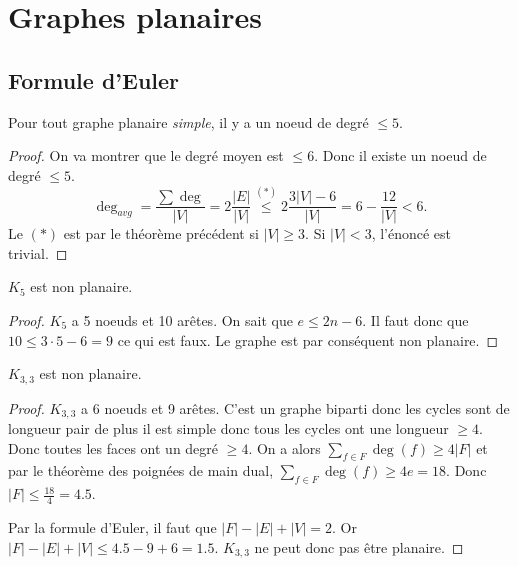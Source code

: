 \section{Graphes planaires}
\subsection{Formule d'Euler}
\begin{mytheo}
  Pour tout graphe planaire \emph{simple}, il y a un noeud de degré $\leq 5$.
  \begin{proof}
    On va montrer que le degré moyen est $\leq 6$.
    Donc il existe un noeud de degré $\leq 5$.
    \[ \deg_{avg} = \frac{\sum \deg}{|V|} = 2\frac{|E|}{|V|} \stackrel{(*)}{\leq} 2\frac{3|V|-6}{|V|} = 6 - \frac{12}{|V|} < 6. \]
    Le $(*)$ est par le théorème précédent si $|V| \geq 3$.
    Si $|V| < 3$, l'énoncé est trivial.
  \end{proof}
\end{mytheo}

\begin{mytheo}
  $K_5$ est non planaire.
  \begin{proof}
    $K_5$ a 5 noeuds et 10 arêtes.
    On sait que $e \leq 2n - 6$.
    Il faut donc que $10 \leq 3 \cdot 5 - 6 = 9$ ce qui est faux.
    Le graphe est par conséquent non planaire.
  \end{proof}
\end{mytheo}

\begin{mytheo}
  $K_{3,3}$ est non planaire.
  \begin{proof}
    $K_{3,3}$ a 6 noeuds et 9 arêtes.
    C'est un graphe biparti donc les cycles sont de longueur pair de plus il est simple donc tous les cycles ont une longueur $\geq 4$.
    Donc toutes les faces ont un degré $\geq 4$.
    On a alors $\sum_{f \in F} \deg(f) \geq 4|F|$ et par le théorème des poignées de main dual, $\sum_{f \in F} \deg(f) \geq 4e = 18$.
    Donc $|F| \leq \frac{18}{4} = 4.5$.

    Par la formule d'Euler, il faut que
    $|F| - |E| + |V| = 2$.
    Or $|F| - |E| + |V| \leq 4.5 - 9 + 6 = 1.5$.
    $K_{3,3}$ ne peut donc pas être planaire.
  \end{proof}
\end{mytheo}

